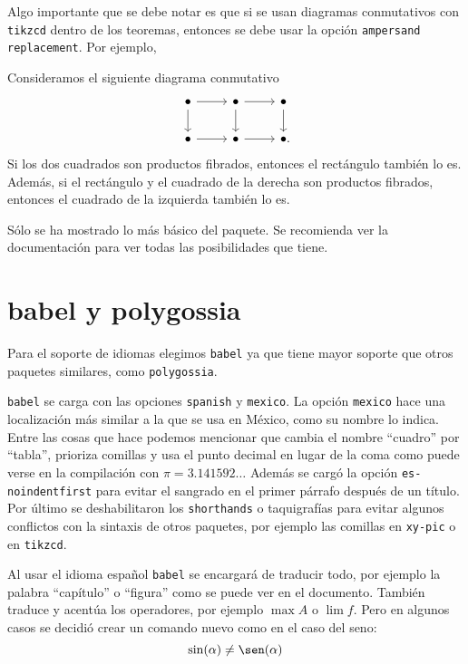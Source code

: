 Algo importante que se debe notar es que si se usan diagramas conmutativos
con \texttt{tikzcd} dentro de los teoremas, entonces se debe usar la opción
\texttt{ampersand replacement}. Por ejemplo,

\begin{theorem}[note=Lema del producto fibrado]
  Consideramos el siguiente diagrama conmutativo
  \begin{equation*}
    \begin{tikzcd}[ampersand replacement=\&]
      \bullet\ar[r]\ar[d] \& \bullet\ar[r]\ar[d] \& \bullet\ar[d]\\
      \bullet\ar[r] \& \bullet\ar[r] \& \bullet\mathrlap{.}
    \end{tikzcd}
  \end{equation*}
  Si los dos cuadrados son productos fibrados, entonces el rectángulo también lo
  es. Además, si el rectángulo y el cuadrado de la derecha son productos fibrados,
  entonces el cuadrado de la izquierda también lo es.
\end{theorem}

Sólo se ha mostrado lo más básico del paquete. Se recomienda ver la
documentación para ver todas las posibilidades que tiene.

\listofkeytheorems 


\section{babel y polygossia}%
\label{sec:babel}
Para el soporte de idiomas elegimos \texttt{babel} ya que tiene mayor soporte que otros paquetes similares, como \texttt{polygossia}.

\texttt{babel} se carga con las opciones \texttt{spanish} y
\texttt{mexico}. La opción \texttt{mexico} hace una localización más similar
a la que se usa en México, como su nombre lo indica. Entre las cosas que
hace podemos mencionar que cambia el nombre \enquote{cuadro} por \enquote{tabla},
prioriza comillas y usa el punto decimal en lugar de la coma como puede
verse en la compilación con \(\pi=3.141592\ldots \) Además se
cargó la opción \texttt{es-noindentfirst} para evitar el sangrado en el
primer párrafo después de un título. Por
último se deshabilitaron los \texttt{shorthands} o taquigrafías para evitar
algunos conflictos con la sintaxis de otros paquetes, por ejemplo las
comillas en \texttt{xy-pic} o en \texttt{tikzcd}.

Al usar el idioma español \texttt{babel} se encargará de traducir todo, por
ejemplo la palabra \enquote{capítulo} o \enquote{figura} como se puede ver
en el documento. También traduce y acentúa los operadores, por ejemplo
\(\max A\) o \(\lim f\). Pero en algunos casos se decidió crear un comando
nuevo como en el caso del seno:
\[
  \sin(\alpha)\ne\sen(\alpha)
\]


